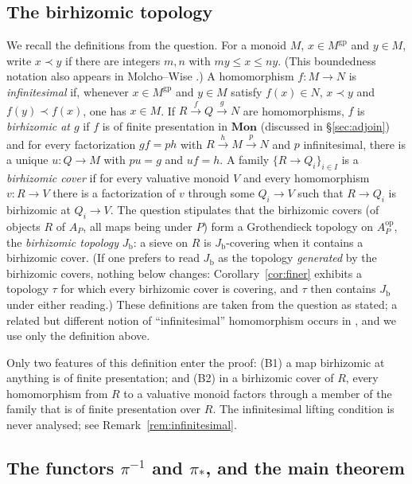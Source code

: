 \documentclass[12pt]{article}
\newcommand{\gp}{\mathrm{gp}}
\newcommand{\Jb}{J_{\mathrm b}}
\theoremstyle{definition}
\theoremstyle{remark}
\begin{document}
\subsection{The birhizomic topology}

We recall the definitions from the question.  For a monoid \(M\),
\(x\in M^{\gp}\) and \(y\in M\), write \(x\prec y\) if there are integers
\(m,n\) with \(my\le x\le ny\).  (This boundedness notation also appears in
Molcho--Wise \cite[Def.~2.1.3.1]{MW}.)  A homomorphism \(f:M\to N\) is
\emph{infinitesimal} if, whenever \(x\in M^{\gp}\) and \(y\in M\) satisfy
\(f(x)\in N\), \(x\prec y\) and \(f(y)\prec f(x)\), one has \(x\in M\).
If \(R\xrightarrow{f}Q\xrightarrow{g}N\) are homomorphisms, \(f\) is
\emph{birhizomic at \(g\)} if \(f\) is of finite presentation in
\(\mathbf{Mon}\) (discussed in \S\ref{sec:adjoin}) and for every factorization \(gf=ph\) with
\(R\xrightarrow{h}M\xrightarrow{p}N\) and \(p\) infinitesimal, there is a
unique \(u:Q\to M\) with \(pu=g\) and \(uf=h\).  A family
\(\{R\to Q_i\}_{i\in I}\) is a \emph{birhizomic cover} if for every valuative
monoid \(V\) and every homomorphism \(v:R\to V\) there is a factorization of
\(v\) through some \(Q_i\to V\) such that \(R\to Q_i\) is birhizomic at
\(Q_i\to V\).  The question stipulates that the birhizomic covers (of objects
\(R\) of \(A_P\), all maps being under \(P\)) form a Grothendieck topology on
\(A_P^{\mathrm{op}}\), the \emph{birhizomic topology} \(\Jb\): a sieve on
\(R\) is \(\Jb\)-covering when it contains a birhizomic cover.  (If one
prefers to read \(\Jb\) as the topology \emph{generated} by the birhizomic
covers, nothing below changes: Corollary~\ref{cor:finer} exhibits a
topology \(\tau\) for which every birhizomic cover is covering, and
\(\tau\) then contains \(\Jb\) under either reading.)  These definitions
are taken from the question as stated; a related but different notion of
``infinitesimal'' homomorphism occurs in \cite[Def.~2.1.2.9]{MW}, and we use
only the definition above.

Only two features of this definition enter the proof:
(B1) a map birhizomic at anything is of finite presentation; and
(B2) in a birhizomic cover of \(R\), every homomorphism from \(R\) to
a valuative monoid factors through a member of the family that is of finite
presentation over \(R\).
The infinitesimal lifting condition is never analysed; see
Remark~\ref{rem:infinitesimal}.

\subsection{The functors \texorpdfstring{\(\pi^{-1}\)}{pi\^{}-1} and
  \texorpdfstring{\(\pi_*\)}{pi\_*}, and the main theorem}
\label{sec:functors}
\end{document}
